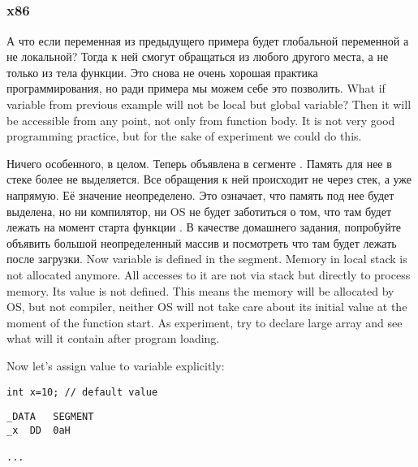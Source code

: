 \subsection{}
\subsubsection{x86}

\IFRU
{А что если переменная  из предыдущего примера будет глобальной переменной а не локальной? 
Тогда к ней смогут обращаться из любого другого места, а не только из тела функции. 
Это снова не очень хорошая практика программирования, но ради примера мы можем себе это позволить.}
{What if  variable from previous example will not be local but global variable? 
Then it will be accessible from any point, not only from function body. 
It is not very good programming practice, but for the sake of experiment we could do this.}



\IFRU
{Ничего особенного, в целом. Теперь  объявлена в сегменте . 
Память для нее в стеке более не выделяется. Все обращения к ней происходит не через стек, а уже напрямую. 
Её значение неопределено. 
Это означает, что память под нее будет выделена, но ни компилятор, ни \ac{OS} не будет заботиться о том, 
что там будет лежать на момент старта функции \main.
В качестве домашнего задания, попробуйте объявить большой неопределенный массив и посмотреть 
что там будет лежать после загрузки.}
{Now  variable is defined in the  segment. 
Memory in local stack is not allocated anymore. 
All accesses to it are not via stack but directly to process memory. 
Its value is not defined. 
This means the memory will be allocated by \ac{OS}, but not compiler, 
neither \ac{OS} will not take care about its initial value at the moment of 
the \main function start.
As experiment, try to declare large array and see what will it contain after 
program loading.}

{Now let's assign value to variable explicitly:}

\begin{lstlisting}
int x=10; // default value
\end{lstlisting}


\begin{lstlisting}
_DATA	SEGMENT
_x	DD	0aH

...
\end{lstlisting}


